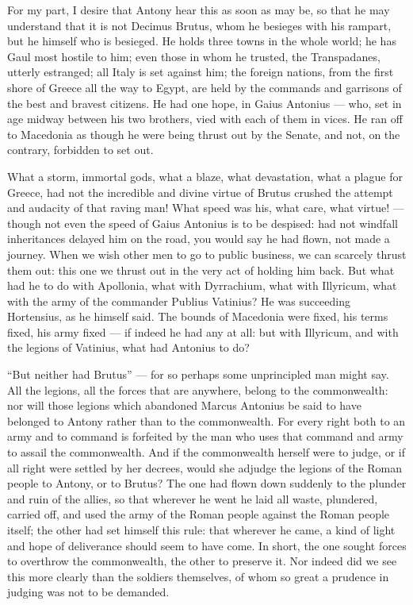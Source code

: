  For my part, I desire that Antony hear this as soon as may be, so that he may understand that it is not Decimus Brutus, whom he besieges with his rampart, but he himself who is besieged. He holds three towns in the whole world; he has Gaul most hostile to him; even those in whom he trusted, the Transpadanes, utterly estranged; all Italy is set against him; the foreign nations, from the first shore of Greece all the way to Egypt, are held by the commands and garrisons of the best and bravest citizens. He had one hope, in Gaius Antonius --- who, set in age midway between his two brothers, vied with each of them in vices. He ran off to Macedonia as though he were being thrust out by the Senate, and not, on the contrary, forbidden to set out.

 What a storm, immortal gods, what a blaze, what devastation, what a plague for Greece, had not the incredible and divine virtue of Brutus crushed the attempt and audacity of that raving man! What speed was his, what care, what virtue! --- though not even the speed of Gaius Antonius is to be despised: had not windfall inheritances delayed him on the road, you would say he had flown, not made a journey. When we wish other men to go to public business, we can scarcely thrust them out: this one we thrust out in the very act of holding him back. But what had he to do with Apollonia, what with Dyrrachium, what with Illyricum, what with the army of the commander Publius Vatinius? He was succeeding Hortensius, as he himself said. The bounds of Macedonia were fixed, his terms fixed, his army fixed --- if indeed he had any at all: but with Illyricum, and with the legions of Vatinius, what had Antonius to do?

 ``But neither had Brutus'' --- for so perhaps some unprincipled man might say. All the legions, all the forces that are anywhere, belong to the commonwealth: nor will those legions which abandoned Marcus Antonius be said to have belonged to Antony rather than to the commonwealth. For every right both to an army and to command is forfeited by the man who uses that command and army to assail the commonwealth. And if the commonwealth herself were to judge, or if all right were settled by her decrees, would she adjudge the legions of the Roman people to Antony, or to Brutus? The one had flown down suddenly to the plunder and ruin of the allies, so that wherever he went he laid all waste, plundered, carried off, and used the army of the Roman people against the Roman people itself; the other had set himself this rule: that wherever he came, a kind of light and hope of deliverance should seem to have come. In short, the one sought forces to overthrow the commonwealth, the other to preserve it. Nor indeed did we see this more clearly than the soldiers themselves, of whom so great a prudence in judging was not to be demanded.

